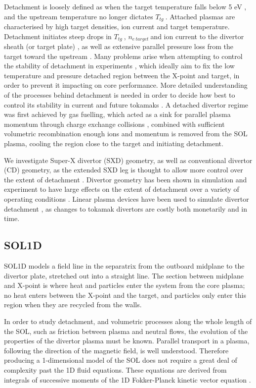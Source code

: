 \documentclass[12pt]{article}  %
\providecommand{\netarget}{$n_{e~target}~$} %
\providecommand{\Ttg}{$T_{tg}~$} %
\begin{document}
Detachment is loosely defined as when the target temperature falls below 5 eV \cite{Porter1996}, and the upstream temperature no longer dictates \Ttg. Attached plasmas are characterised by high target densities, ion current and target temperature. Detachment initiates steep drops in \Ttg, \netarget and ion current to the divertor sheath (or target plate) \cite{Stacey2001}, as well as extensive parallel pressure loss from the target toward the upstream \cite{Nakazawa2000}. Many problems arise when attempting to control the stability of detachment in experiments \cite{Lipschultz2016}, which ideally aim to fix the low temperature and pressure detached region between the X-point and target, in order to prevent it impacting on core performance. More detailed understanding of the processes behind detachment is needed in order to decide how best to control its stability in current and future tokamaks \cite{Reimold2015}. A detached divertor regime was first achieved by gas fuelling, which acted as a sink for parallel plasma momentum through charge exchange collisions \cite{Loarte1998}, combined with sufficient volumetric recombination \cite{Wischmeier2009} enough ions and momentum is removed from the SOL plasma, cooling the region close to the target and initiating detachment.

We investigate Super-X divertor (SXD) geometry, as well as conventional divertor (CD) geometry, as the extended SXD leg is thought to allow more control over the extent of detachment \cite{Valanju2009}. Divertor geometry has been shown in simulation and experiment to have large effects on the extent of detachment over a variety of operating conditions \cite{Pitts2001}. Linear plasma devices have been used to simulate divertor detachment \cite{Nishijima2002, Ohno2002}, as changes to tokamak divertors are costly both monetarily and in time.

\subsection{SOL1D}\label{ssecSOL1D}
SOL1D models a field line in the separatrix from the outboard midplane to the divertor plate, stretched out into a straight line. The section between midplane and X-point is where heat and particles enter the system from the core plasma; no heat enters between the X-point and the target, and particles only enter this region when they are recycled from the walls.

In order to study detachment, and volumetric processes along the whole length of the SOL, such as friction between plasma and neutral flows, the evolution of the properties of the divertor plasma must be known. Parallel transport in a plasma, following the direction of the magnetic field, is well understood. Therefore producing a 1-dimensional model of the SOL does not require a great deal of complexity past the 1D fluid equations. These equations are derived from integrals of successive moments of the 1D Fokker-Planck kinetic vector equation \cite{Stangeby}.
\end{document}
